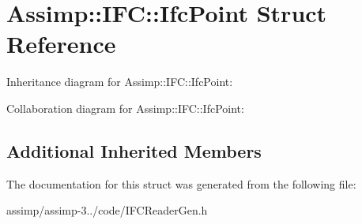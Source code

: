\hypertarget{struct_assimp_1_1_i_f_c_1_1_ifc_point}{\section{Assimp\+:\+:I\+F\+C\+:\+:Ifc\+Point Struct Reference}
\label{struct_assimp_1_1_i_f_c_1_1_ifc_point}
}


Inheritance diagram for Assimp\+:\+:I\+F\+C\+:\+:Ifc\+Point\+:


Collaboration diagram for Assimp\+:\+:I\+F\+C\+:\+:Ifc\+Point\+:
\subsection*{Additional Inherited Members}


The documentation for this struct was generated from the following file\+:\begin{DoxyCompactItemize}
\item 
assimp/assimp-\/3../code/I\+F\+C\+Reader\+Gen.\+h\end{DoxyCompactItemize}

